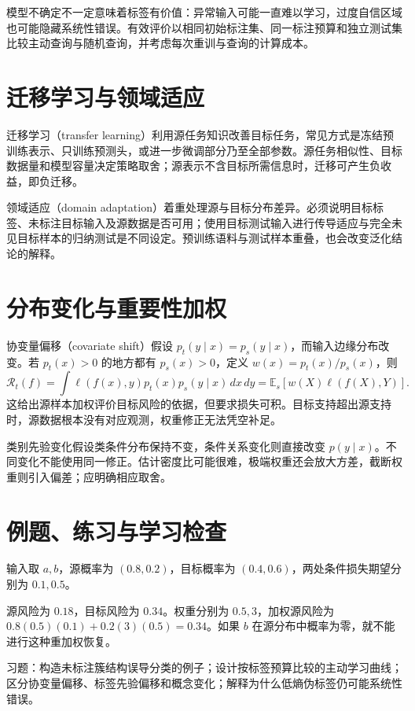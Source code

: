 模型不确定不一定意味着标签有价值：异常输入可能一直难以学习，过度自信区域也可能隐藏系统性错误。有效评价以相同初始标注集、同一标注预算和独立测试集比较主动查询与随机查询，并考虑每次重训与查询的计算成本。

\section{迁移学习与领域适应}

迁移学习（transfer learning）利用源任务知识改善目标任务，常见方式是冻结预训练表示、只训练预测头，或进一步微调部分乃至全部参数。源任务相似性、目标数据量和模型容量决定策略取舍；源表示不含目标所需信息时，迁移可产生负收益，即负迁移。

领域适应（domain adaptation）着重处理源与目标分布差异。必须说明目标标签、未标注目标输入及源数据是否可用；使用目标测试输入进行传导适应与完全未见目标样本的归纳测试是不同设定。预训练语料与测试样本重叠，也会改变泛化结论的解释。

\section{分布变化与重要性加权}

协变量偏移（covariate shift）假设 $p_t(y\mid x)=p_s(y\mid x)$，而输入边缘分布改变。若 $p_t(x)>0$ 的地方都有 $p_s(x)>0$，定义 $w(x)=p_t(x)/p_s(x)$，则
\begin{equation}
 \mathcal R_t(f)=\int\ell(f(x),y)p_t(x)p_s(y\mid x)\,dx\,dy
 =\mathbb E_s[w(X)\ell(f(X),Y)].
 \label{eq:ml-covariate-shift}
\end{equation}
这给出源样本加权评价目标风险的依据，但要求损失可积。目标支持超出源支持时，源数据根本没有对应观测，权重修正无法凭空补足。

类别先验变化假设类条件分布保持不变，条件关系变化则直接改变 $p(y\mid x)$。不同变化不能使用同一修正。估计密度比可能很难，极端权重还会放大方差，截断权重则引入偏差；应明确相应取舍。

\section{例题、练习与学习检查}

\begin{example}[离散协变量偏移]
输入取 $a,b$，源概率为 $(0.8,0.2)$，目标概率为 $(0.4,0.6)$，两处条件损失期望分别为 $0.1,0.5$。
\end{example}
\begin{solve}
源风险为 $0.18$，目标风险为 $0.34$。权重分别为 $0.5,3$，加权源风险为 $0.8(0.5)(0.1)+0.2(3)(0.5)=0.34$。如果 $b$ 在源分布中概率为零，就不能进行这种重加权恢复。
\end{solve}

习题：构造未标注簇结构误导分类的例子；设计按标签预算比较的主动学习曲线；区分协变量偏移、标签先验偏移和概念变化；解释为什么低熵伪标签仍可能系统性错误。





